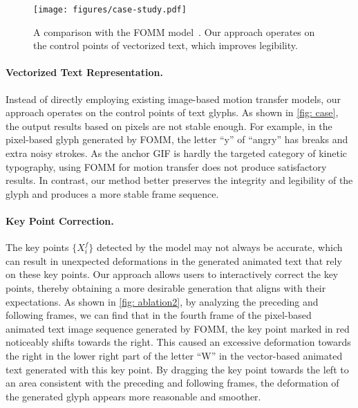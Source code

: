 \label{sec:case}

\begin{figure}[t]
  \centering
  \texttt{[image: figures/case-study.pdf]}
  \caption{A comparison with the FOMM model~\cite{siarohin2019first}. Our approach operates on the control points of vectorized text, which improves legibility.}
  \label{fig: case}
\end{figure}
\paragraph{Vectorized Text Representation.}
Instead of directly employing existing image-based motion transfer models, our approach operates on the control points of text glyphs.
As shown in \autoref{fig: case}, the output results based on pixels are not stable enough.
For example, in the pixel-based glyph generated by FOMM, the letter ``y'' of ``angry'' has breaks and extra noisy strokes.
As the anchor GIF is hardly the targeted category of kinetic typography, using FOMM for motion transfer does not produce satisfactory results. 
In contrast, our method better preserves the integrity and legibility of the glyph and produces a more stable frame sequence.



\paragraph{Key Point Correction.}
The key points $\{X_i^f\}$ detected by the model may not always be accurate, which can result in unexpected deformations in the generated animated text that rely on these key points. 
Our approach allows users to interactively correct the key points, thereby obtaining a more desirable generation that aligns with their expectations.
As shown in \autoref{fig: ablation2}, by analyzing the preceding and following frames, we can find that in the fourth frame of the pixel-based animated text image sequence generated by FOMM, the key point marked in red noticeably shifts towards the right. 
This caused an excessive deformation towards the right in the lower right part of the letter ``W'' in the vector-based animated text generated with this key point. 
By dragging the key point towards the left to an area consistent with the preceding and following frames, the deformation of the generated glyph appears more reasonable and smoother.


